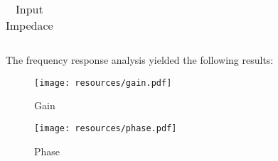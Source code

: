 \FloatBarrier
\begin{table}[h]
  \centering
  \begin{tabular}{|c|c|}
    \hline    
    
    \hline
  \end{tabular}
  \caption{Input Impedace}
  \label{tab:Spice1}
\end{table}
\FloatBarrier  

The frequency response analysis yielded the following results:
\FloatBarrier  
\begin{figure} [!htb] 
  \texttt{[image: resources/gain.pdf]}
  \caption{Gain}
  \label{fig:theoplots}
  \hfill
\end{figure}
\FloatBarrier  

\FloatBarrier
\begin{figure} [!htb] 
  \texttt{[image: resources/phase.pdf]}
  \caption{Phase}
  \label{fig:theoplots}
  \endminipage\hfill
\end{figure}
\FloatBarrier


